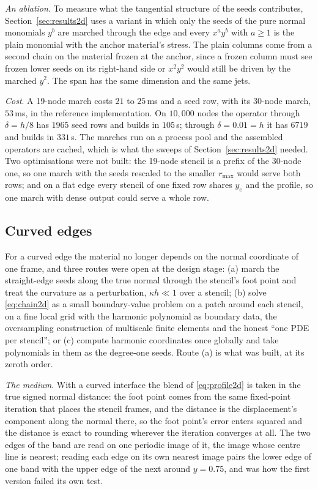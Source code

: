 \documentclass[11pt]{amsart}
\theoremstyle{definition}
\theoremstyle{remark}
\newcommand{\para}[1]{\par\smallskip\noindent\textit{#1}.\enspace}
\begin{document}
\para{An ablation}
To measure what the tangential structure of the seeds contributes,
Section~\ref{sec:results2d} uses a variant in which only the seeds of
the pure normal monomials $y^b$ are marched through the edge and every
$x^a y^b$ with $a \ge 1$ is the plain monomial with the anchor
material's stress. The plain columns come from a second chain on the
material frozen at the anchor, since a frozen column must see frozen
lower seeds on its right-hand side or $x^2 y^2$ would still be driven by
the marched $y^2$. The span has the same dimension and the same jets.

\para{Cost}
A 19-node march costs $21$ to $25$\,ms and a seed row, with its 30-node
march, $53$\,ms, in the reference implementation. On $10{,}000$ nodes
the operator through $\delta = h / 8$ has $1965$ seed rows and builds in
$105$\,s; through $\delta = 0.01 = h$ it has $6719$ and builds in
$331$\,s. The marches run on a process pool and the assembled operators
are cached, which is what the sweeps of Section~\ref{sec:results2d}
needed. Two optimisations were not built: the 19-node stencil is a
prefix of the 30-node one, so one march with the seeds rescaled to the
smaller $r_{\max}$ would serve both rows; and on a flat edge every
stencil of one fixed row shares $y_e$ and the profile, so one march with
dense output could serve a whole row.

\subsection{Curved edges}
\label{sec:curved2d}
For a curved edge the material no longer depends on the normal
coordinate of one frame, and three routes were open at the design stage:
(a) march the straight-edge seeds along the true normal through the
stencil's foot point and treat the curvature as a perturbation, $\kappa h
\ll 1$ over a stencil; (b) solve \eqref{eq:chain2d} as a small
boundary-value problem on a patch around each stencil, on a fine local
grid with the harmonic polynomial as boundary data, the oversampling
construction of multiscale finite elements \cite{HouWu1997} and the
honest ``one PDE per stencil''; or (c) compute harmonic coordinates once
globally \cite{OwhadiZhang2007} and take polynomials in them as the
degree-one seeds. Route (a) is what was built, at its zeroth order.

\para{The medium}
With a curved interface the blend of \eqref{eq:profile2d} is taken in
the true signed normal distance: the foot point comes from the same
fixed-point iteration that places the stencil frames, and the distance
is the displacement's component along the normal there, so the foot
point's error enters squared and the distance is exact to rounding
wherever the iteration converges at all. The two edges of the band are
read on one periodic image of it, the image whose centre line is
nearest; reading each edge on its own nearest image pairs the lower edge
of one band with the upper edge of the next around $y = 0.75$, and was
how the first version failed its own test.
\end{document}

